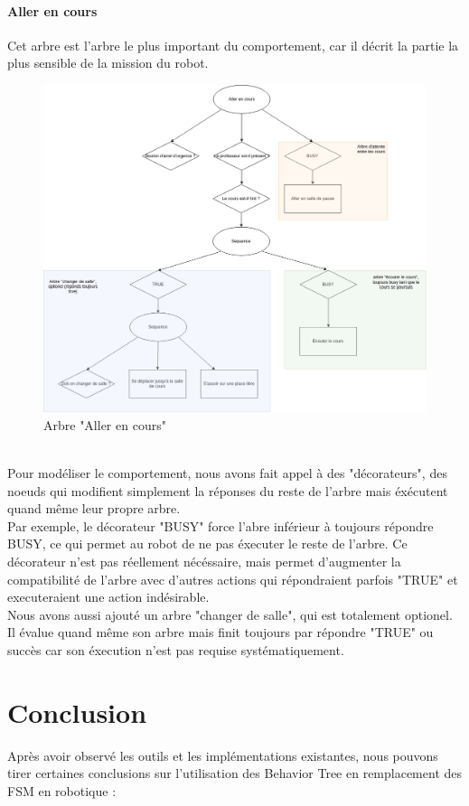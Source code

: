 \documentclass[titlepage]{article}
\begin{document}
	\paragraph{Aller en cours}
	Cet arbre est l'arbre le plus important du comportement, car il décrit la partie la plus sensible de la mission du robot.
	\begin{figure}[h!]
		\centering
		\includegraphics[width=\linewidth]{img/BT_5.png}
		\caption{Arbre "Aller en cours"}
		\label{fig:exemple_4}
	\end{figure}
	\\
	Pour modéliser le comportement, nous avons fait appel à des "décorateurs", des noeuds qui modifient simplement la réponses du reste de l'arbre mais éxécutent quand même leur propre arbre. 
	\\
	Par exemple, le décorateur "BUSY" force l'abre inférieur à toujours répondre BUSY, ce qui permet au robot de ne pas éxecuter le reste de l'arbre. Ce décorateur n'est pas réellement nécéssaire, mais permet d'augmenter la compatibilité de l'arbre avec d'autres actions qui répondraient parfois "TRUE" et executeraient une action indésirable. 
	\\
	Nous avons aussi ajouté un arbre "changer de salle", qui est totalement optionel. Il  évalue quand même son arbre mais finit toujours par répondre "TRUE" ou succès car son éxecution n'est pas requise systématiquement.
	\clearpage
	\section{Conclusion}
	Après avoir observé les outils et les implémentations existantes, nous pouvons tirer certaines conclusions sur l'utilisation des Behavior Tree en remplacement des FSM en robotique :
\end{document}
